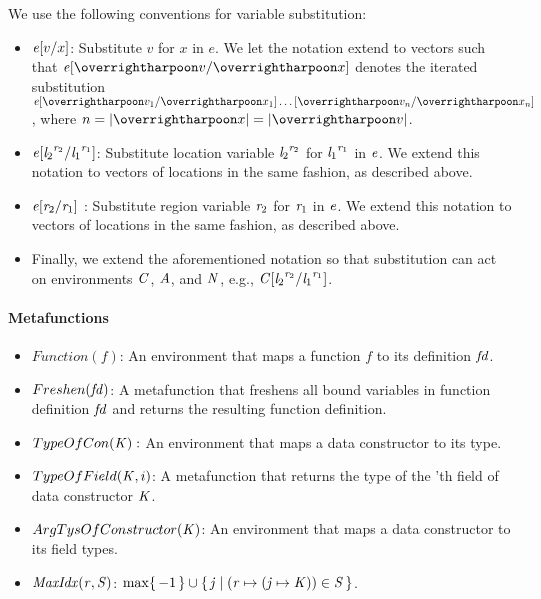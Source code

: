 %
We use the following conventions for variable substitution:
%
\begin{itemize}
\item $\subst{\EXPR}{x}{v}$: Substitute $v$ for $x$ in $e$. We let the notation extend to vectors such that
$\subst{\EXPR}{\overharpoon{x}}{\overharpoon{v}}$ denotes the iterated substitution $\subst{\EXPR}{\overharpoon{x_1}}{\overharpoon{v_1}} \ldots \subst{}{\overharpoon{x_n}}{\overharpoon{v_n}}$, where $n = |\overharpoon{x}| = |\overharpoon{v}|$.

\item $\subst{\EXPR}{\locreg{\loc_1}{\reg_1}}{\locreg{\loc_2}{\reg_2}}$: Substitute location variable $\locreg{\loc_2}{\reg_2}$ for $\locreg{\loc_1}{\reg_1}$ in $\EXPR$. We extend this notation to vectors of locations in the same fashion, as described above.

\item $\subst{\EXPR}{\reg_1}{\reg_2}$ : Substitute region variable $\reg_2$ for $\reg_1$ in $\EXPR$. We extend this notation to vectors of locations in the same fashion, as described above.

\item Finally, we extend the aforementioned notation so that
  substitution can act on environments $\CENV$, $\AENV$, and $\NENV$,
  e.g.,
  $\subst{\CENV}{\locreg{\loc_1}{\reg_1}}{\locreg{\loc_2}{\reg_2}}$.
\end{itemize}

\paragraph{Metafunctions}

\begin{itemize}
\item $Function(f)$: An environment that maps a function $f$ to its definition $\FD$.

\item $Freshen(\FD)$: A metafunction that freshens all bound variables in function definition
$\FD$ and returns the resulting function definition.

\item $TypeOfCon(\DC):$ An environment that maps a data constructor to its type.

\item $TypeOfField(\DC,i)$: A metafunction that returns the type of the 'th field
of data constructor $\DC$.

\item $ArgTysOfConstructor(\DC)$: An environment that maps a data constructor to its field types.

\item $\allocptr{\reg}{\STOR}$: $\max \set{-1} \cup \set{ \indj \; | \; {(\reg \mapsto (\indj \mapsto \DC)) \in \STOR}}$.
\end{itemize}

